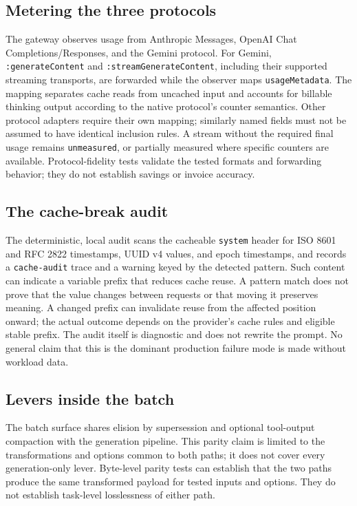 \documentclass[11pt,a4paper]{article}
\begin{document}
\subsection{Metering the three protocols}
The gateway observes usage from Anthropic Messages, OpenAI Chat Completions/Responses, and the
Gemini protocol. For Gemini, \texttt{:generateContent} and \texttt{:streamGenerateContent},
including their supported streaming transports, are forwarded while the observer maps
\texttt{usageMetadata}. The mapping separates cache reads from uncached input and accounts for
billable thinking output according to the native protocol's counter semantics. Other protocol
adapters require their own mapping; similarly named fields must not be assumed to have identical
inclusion rules. A stream without the required final usage remains \texttt{unmeasured}, or
partially measured where specific counters are available. Protocol-fidelity tests validate the
tested formats and forwarding behavior; they do not establish savings or invoice accuracy.

\subsection{The cache-break audit}\label{sec:audit}
The deterministic, local audit scans the cacheable \texttt{system} header for ISO 8601 and RFC
2822 timestamps, UUID v4 values, and epoch timestamps, and records a \texttt{cache-audit} trace
and a warning keyed by the detected pattern. Such content can indicate a variable prefix that
reduces cache reuse. A pattern match does not prove that the value changes between requests or
that moving it preserves meaning. A changed prefix can invalidate reuse from the affected
position onward; the actual outcome depends on the provider's cache rules and eligible stable
prefix. The audit itself is diagnostic and does not rewrite the prompt. No general claim that
this is the dominant production failure mode is made without workload data.

\subsection{Levers inside the batch}
The batch surface shares elision by supersession and optional tool-output compaction with the
generation pipeline. This parity claim is limited to the transformations and options common to
both paths; it does not cover every generation-only lever. Byte-level parity tests can establish
that the two paths produce the same transformed payload for tested inputs and options. They do
not establish task-level losslessness of either path.
\end{document}
